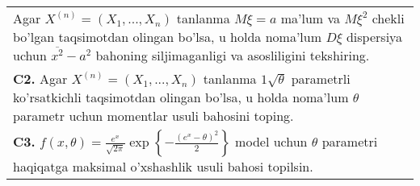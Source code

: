 \documentclass{article}
\begin{document}
\begin{tabular}{m{17cm}}
Agar \(X^{(n)} = \left( X_{1},...,X_{n} \right)\) tanlanma \(M\xi = a\) ma'lum va \(M\xi^{2}\) chekli bo'lgan taqsimotdan olingan bo'lsa, u holda noma'lum \(D\xi\) dispersiya uchun \(\overline{x^{2}} - a^{2}\) bahoning siljimaganligi va asosliligini tekshiring.
\\
\textbf{C2.} 
Agar \(X^{(n)} = \left( X_{1},...,X_{n} \right)\) tanlanma \(1\sqrt{\theta}\) parametrli ko'rsatkichli taqsimotdan olingan bo'lsa, u holda noma'lum \(\theta\) parametr uchun momentlar usuli bahosini toping.
\\
\textbf{C3.} 
\(f(x,\theta) = \frac{e^{x}}{\sqrt{2\pi}}\exp\left\{ - \frac{\left( e^{x} - \theta \right)^{2}}{2} \right\}\) model uchun \(\theta\) parametri haqiqatga maksimal o'xshashlik usuli bahosi topilsin.
\\

\end{tabular}
\vspace{1cm}
\end{document}
